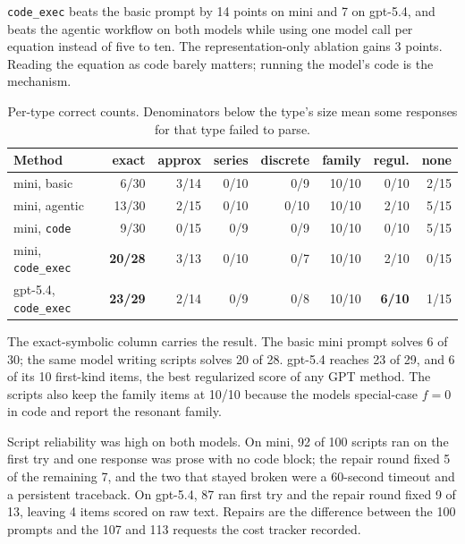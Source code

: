 \documentclass[11pt]{article}
\begin{document}
\texttt{code\_exec} beats the basic prompt by 14 points on mini and 7 on
gpt-5.4, and beats the agentic workflow on both models while using one model
call per equation instead of five to ten. The representation-only ablation
gains 3 points. Reading the equation as code barely matters; running the
model's code is the mechanism.

\begin{table}[h]
\centering
\begin{tabular}{lrrrrrrr}
\toprule
Method & exact & approx & series & discrete & family & regul. & none \\
\midrule
mini, basic     & 6/30  & 3/14 & 0/10 & 0/9 & 10/10 & 0/10 & 2/15 \\
mini, agentic   & 13/30 & 2/15 & 0/10 & 0/10 & 10/10 & 2/10 & 5/15 \\
mini, \texttt{code}      & 9/30  & 0/15 & 0/9  & 0/9 & 10/10 & 0/10 & 5/15 \\
mini, \texttt{code\_exec} & \textbf{20/28} & 3/13 & 0/10 & 0/7 & 10/10 & 2/10 & 0/15 \\
gpt-5.4, \texttt{code\_exec} & \textbf{23/29} & 2/14 & 0/9 & 0/8 & 10/10 & \textbf{6/10} & 1/15 \\
\bottomrule
\end{tabular}
\caption{Per-type correct counts. Denominators below the type's size mean
some responses for that type failed to parse.}
\end{table}

The exact-symbolic column carries the result. The basic mini prompt solves 6
of 30; the same model writing scripts solves 20 of 28. gpt-5.4 reaches 23 of
29, and 6 of its 10 first-kind items, the best regularized score of any GPT
method. The scripts also keep the family items at 10/10 because the models
special-case $f = 0$ in code and report the resonant family.

Script reliability was high on both models. On mini, 92 of 100 scripts ran
on the first try and one response was prose with no code block; the repair
round fixed 5 of the remaining 7, and the two that stayed broken were a
60-second timeout and a persistent traceback. On gpt-5.4, 87 ran first try
and the repair round fixed 9 of 13, leaving 4 items scored on raw text.
Repairs are the difference between the 100 prompts and the 107 and 113
requests the cost tracker recorded.
\end{document}
